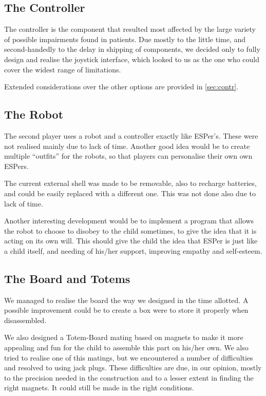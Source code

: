 \documentclass[a4paper,twoside]{book}
\begin{document}
\subsection*{The Controller}

The controller is the component that resulted most affected by the large variety of possible impairments found in patients. Due mostly to the little time, and second-handedly to the delay in shipping of components, we decided only to fully design and realise the joystick interface, which looked to us as the one who could cover the widest range of limitations.

Extended considerations over the other options are provided in \autoref{sec:contr}.

\subsection*{The Robot}

The second player uses a robot and a controller exactly like ESPer's. These were not realised mainly due to lack of time. Another good idea would be to create multiple \textquotedblleft{}outfits\textquotedblright{} for the robots, so that players can  personalise their own own ESPers.

The current external shell was made to be removable, also to recharge batteries, and could be easily replaced with a different one. This was not done also due to lack of time. 

Another interesting development would be to implement a program that allows the robot to choose to disobey to the child sometimes, to give the idea that it is acting on its own will. This should give the child the idea that ESPer is just like a child itself, and needing of his/her support, improving empathy and self-esteem.

\subsection*{The Board and Totems}

We managed to realise the board the way we designed in the time allotted. A possible improvement could be to create a box were to store it properly when disassembled. 

We also designed a Totem-Board mating based on magnets to make it more appealing and fun for the child to assemble this part on his/her own. We also tried to realise one of this matings, but we encountered a number of difficulties and resolved to using jack plugs. These difficulties are due, in our opinion, mostly to the precision needed in the construction and  to a lesser extent in finding the right magnets. It could still be made in the right conditions.
\end{document}
